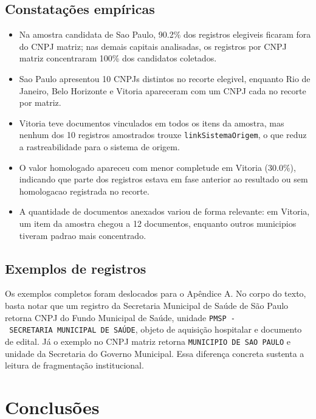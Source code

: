 \documentclass[12pt]{article}
\providecommand{\tightlist}{%
  \setlength{\itemsep}{0pt}\setlength{\parskip}{0pt}}
\begin{document}
\subsection{Constatações
empíricas}\label{constatauxe7uxf5es-empuxedricas}

\begin{itemize}
\tightlist
\item
  Na amostra candidata de Sao Paulo, 90.2\% dos registros elegiveis
  ficaram fora do CNPJ matriz; nas demais capitais analisadas, os
  registros por CNPJ matriz concentraram 100\% dos candidatos coletados.
\item
  Sao Paulo apresentou 10 CNPJs distintos no recorte elegivel, enquanto
  Rio de Janeiro, Belo Horizonte e Vitoria apareceram com um CNPJ cada
  no recorte por matriz.
\item
  Vitoria teve documentos vinculados em todos os itens da amostra, mas
  nenhum dos 10 registros amostrados trouxe \texttt{linkSistemaOrigem},
  o que reduz a rastreabilidade para o sistema de origem.
\item
  O valor homologado apareceu com menor completude em Vitoria (30.0\%),
  indicando que parte dos registros estava em fase anterior ao resultado
  ou sem homologacao registrada no recorte.
\item
  A quantidade de documentos anexados variou de forma relevante: em
  Vitoria, um item da amostra chegou a 12 documentos, enquanto outros
  municipios tiveram padrao mais concentrado.
\end{itemize}

\subsection{Exemplos de registros}\label{exemplos-de-registros}

Os exemplos completos foram deslocados para o Apêndice A. No corpo do
texto, basta notar que um registro da Secretaria Municipal de Saúde de
São Paulo retorna CNPJ do Fundo Municipal de Saúde, unidade
\texttt{PMSP\ -\ SECRETARIA\ MUNICIPAL\ DE\ SAÚDE}, objeto de aquisição
hospitalar e documento de edital. Já o exemplo no CNPJ matriz retorna
\texttt{MUNICIPIO\ DE\ SAO\ PAULO} e unidade da Secretaria do Governo
Municipal. Essa diferença concreta sustenta a leitura de fragmentação
institucional.

\section{Conclusões}\label{conclusuxf5es}
\end{document}
